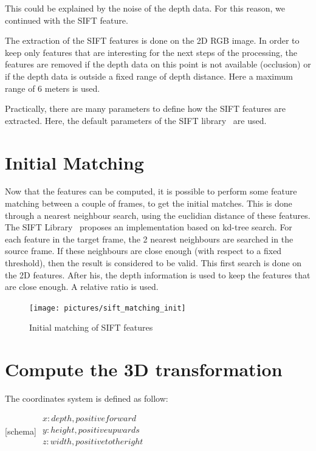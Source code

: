 This could be explained by the noise of the depth data. For this reason, we continued with the SIFT feature.

The extraction of the SIFT features is done on the 2D RGB image. In order to keep only features that are interesting for the next steps of the processing, the features are removed if the depth data on this point is not available (occlusion) or if the depth data is outside a fixed range of depth distance. Here a maximum range of 6 meters is used.

Practically, there are many parameters to define how the SIFT features are extracted. Here, the default parameters of the SIFT library~\cite{hess_sift} are used.

\section{Initial Matching}

Now that the features can be computed, it is possible to perform some feature matching between a couple of frames, to get the initial matches. This is done through a nearest neighbour search, using the euclidian distance of these features.  
The SIFT Library~\cite{hess_sift} proposes an implementation based on kd-tree search. For each feature in the target frame, the 2 nearest neighbours are searched in the source frame. If these neighbours are close enough (with respect to a fixed threshold), then the result is considered to be valid. This first search is done on the 2D features.
After his, the depth information is used to keep the features that are close enough. A relative ratio is used.

\begin{figure}[h!]
\centering
\texttt{[image: pictures/sift\_matching\_init]}
\caption{Initial matching of SIFT features}
\end{figure}

\section{Compute the 3D transformation}

The coordinates system is defined as follow:

[schema]
\(
\begin{array}{l}
x: depth, positive forward\\
y: height, positive upwards\\
z: width, positive to the right\\
\end{array}
\)

